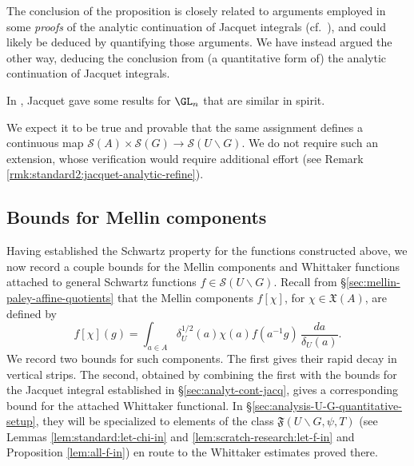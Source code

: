 \begin{remark}
  The conclusion of the proposition is closely related to arguments employed in some \emph{proofs} of the analytic continuation of Jacquet integrals (cf.\ \cite[Thm 2.1]{MR563369}), and could likely be deduced by quantifying those arguments.  We have instead argued the other way, deducing the conclusion from (a quantitative form of) the analytic continuation of Jacquet integrals.
\end{remark}
\begin{remark}
  In \cite{MR2058615}, Jacquet gave some results for $\GL_n$ that are similar in spirit.
\end{remark}
\begin{remark}\label{rmk:standard2:we-expect-it-extend-S}
  We expect it to be true and provable that the same assignment defines a continuous map $\mathcal{S}(A) \times \mathcal{S}(G) \rightarrow \mathcal{S}(U \backslash G)$.  We do not require such an extension, whose verification would require additional effort (see Remark \ref{rmk:standard2:jacquet-analytic-refine}).
\end{remark}

\subsection{Bounds for Mellin components}\label{sec:qual-mellin-component-bounds}
Having established the Schwartz property for the functions constructed above, we now record a couple bounds for the Mellin components and Whittaker functions attached to general Schwartz functions $f \in \mathcal{S}(U \backslash G)$.  Recall from \S\ref{sec:mellin-paley-affine-quotients} that the Mellin components $f[\chi]$, for $\chi \in \mathfrak{X}(A)$, are defined by
\begin{equation*}
  f[\chi](g) = \int_{a \in A} \delta_U^{1/2}(a)\chi(a)f(a^{-1} g)\,\frac{d a}{\delta_U(a)}.
\end{equation*}
We record two bounds for such components.  The first gives their rapid decay in vertical strips.  The second, obtained by combining the first with the bounds for the Jacquet integral established in \S\ref{sec:analyt-cont-jacq}, gives a corresponding bound for the attached Whittaker functional.  In \S\ref{sec:analysis-U-G-quantitative-setup}, they will be specialized to elements of the class $\mathfrak{F}(U \backslash G,\psi,T)$ (see Lemmas \ref{lem:standard:let-chi-in} and \ref{lem:scratch-research:let-f-in} and Proposition \ref{lem:all-f-in}) en route to the Whittaker estimates proved there.

